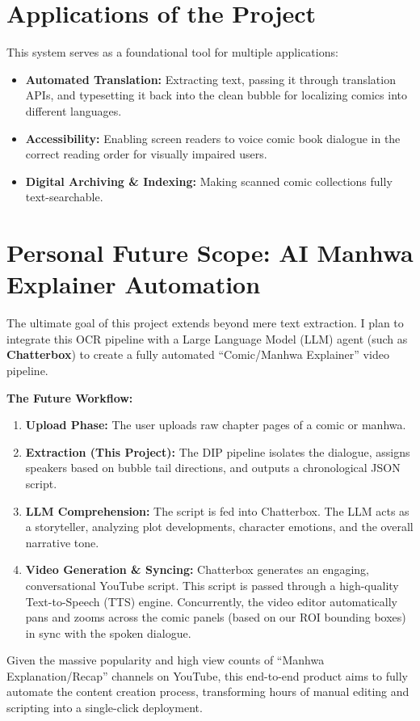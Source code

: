 \documentclass{article}
\begin{document}
\section{Applications of the Project}
This system serves as a foundational tool for multiple applications:
\begin{itemize}
    \item \textbf{Automated Translation:} Extracting text, passing it through translation APIs, and typesetting it back into the clean bubble for localizing comics into different languages.
    \item \textbf{Accessibility:} Enabling screen readers to voice comic book dialogue in the correct reading order for visually impaired users.
    \item \textbf{Digital Archiving \& Indexing:} Making scanned comic collections fully text-searchable.
\end{itemize}

\section{Personal Future Scope: AI Manhwa Explainer Automation}
The ultimate goal of this project extends beyond mere text extraction. I plan to integrate this OCR pipeline with a Large Language Model (LLM) agent (such as \textbf{Chatterbox}) to create a fully automated ``Comic/Manhwa Explainer'' video pipeline. 

\textbf{The Future Workflow:}
\begin{enumerate}
    \item \textbf{Upload Phase:} The user uploads raw chapter pages of a comic or manhwa.
    \item \textbf{Extraction (This Project):} The DIP pipeline isolates the dialogue, assigns speakers based on bubble tail directions, and outputs a chronological JSON script.
    \item \textbf{LLM Comprehension:} The script is fed into Chatterbox. The LLM acts as a storyteller, analyzing plot developments, character emotions, and the overall narrative tone.
    \item \textbf{Video Generation \& Syncing:} Chatterbox generates an engaging, conversational YouTube script. This script is passed through a high-quality Text-to-Speech (TTS) engine. Concurrently, the video editor automatically pans and zooms across the comic panels (based on our ROI bounding boxes) in sync with the spoken dialogue.
\end{enumerate}
Given the massive popularity and high view counts of ``Manhwa Explanation/Recap'' channels on YouTube, this end-to-end product aims to fully automate the content creation process, transforming hours of manual editing and scripting into a single-click deployment.
\end{document}
